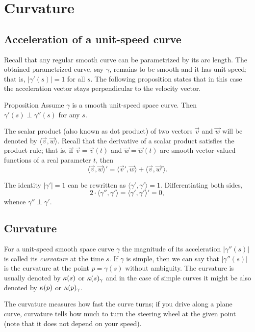 \chapter{Curvature}

\section*{Acceleration of a unit-speed curve}

Recall that any regular smooth curve can be parametrized by its arc length.
The obtained parametrized curve, say $\gamma$, remains to be smooth and it has unit speed; 
that is, $|\gamma'(s)|=1$ for all $s$.
The following proposition states that in this case
the acceleration vector stays perpendicular to the velocity vector.

\begin{thm}{Proposition}\label{prop:a'-pertp-a''}
Assume $\gamma$ is a smooth unit-speed space curve.
Then $\gamma'(s)\perp \gamma''(s)$ for any $s$.
\end{thm}

The scalar product (also known as dot product) of two vectors $\vec v$ and $\vec w$ will be denoted by $\langle \vec v,\vec w\rangle$.
Recall that the derivative of a scalar product satisfies the product rule;
that is, if $\vec v=\vec v(t)$ and $\vec w=\vec w(t)$ are smooth vector-valued functions of a real parameter $t$, then
\[\langle \vec v,\vec w\rangle'=\langle \vec v',\vec w\rangle+\langle \vec v,\vec w'\rangle.\]

The identity $|\gamma'|=1$ can be rewritten as $\langle\gamma',\gamma'\rangle=1$.
Differentiating both sides, 
\[2\cdot\langle\gamma'',\gamma'\rangle=\langle\gamma',\gamma'\rangle'=0,\]
whence $\gamma''\perp\gamma'$.
\qeds

\section*{Curvature}

For a unit-speed smooth space curve $\gamma$ the magnitude of its acceleration $|\gamma''(s)|$ is called its \emph{curvature} at the time $s$.
\label{page:curvature}
If $\gamma$ is simple, then we can say that $|\gamma''(s)|$ is the curvature at the point $p=\gamma(s)$ without ambiguity.
The curvature is usually denoted by $\kappa(s)$ or $\kappa(s)_\gamma$ and in the case of simple curves it might be also denoted by $\kappa(p)$ or $\kappa(p)_\gamma$.

The curvature measures how fast the curve turns;
if you drive along a plane curve, curvature tells how much to turn the steering wheel at the given point (note that it does not depend on your speed).

